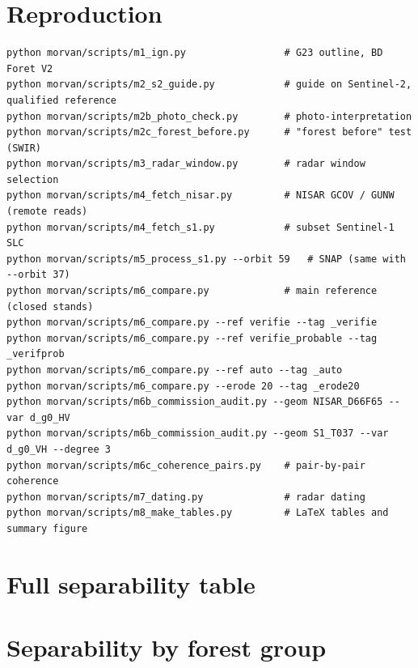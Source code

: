 \documentclass[11pt,a4paper]{article}
\begin{document}
\appendix
\section{Reproduction}
\begin{verbatim}
python morvan/scripts/m1_ign.py                 # G23 outline, BD Foret V2
python morvan/scripts/m2_s2_guide.py            # guide on Sentinel-2, qualified reference
python morvan/scripts/m2b_photo_check.py        # photo-interpretation
python morvan/scripts/m2c_forest_before.py      # "forest before" test (SWIR)
python morvan/scripts/m3_radar_window.py        # radar window selection
python morvan/scripts/m4_fetch_nisar.py         # NISAR GCOV / GUNW (remote reads)
python morvan/scripts/m4_fetch_s1.py            # subset Sentinel-1 SLC
python morvan/scripts/m5_process_s1.py --orbit 59   # SNAP (same with --orbit 37)
python morvan/scripts/m6_compare.py             # main reference (closed stands)
python morvan/scripts/m6_compare.py --ref verifie --tag _verifie
python morvan/scripts/m6_compare.py --ref verifie_probable --tag _verifprob
python morvan/scripts/m6_compare.py --ref auto --tag _auto
python morvan/scripts/m6_compare.py --erode 20 --tag _erode20
python morvan/scripts/m6b_commission_audit.py --geom NISAR_D66F65 --var d_g0_HV
python morvan/scripts/m6b_commission_audit.py --geom S1_T037 --var d_g0_VH --degree 3
python morvan/scripts/m6c_coherence_pairs.py    # pair-by-pair coherence
python morvan/scripts/m7_dating.py              # radar dating
python morvan/scripts/m8_make_tables.py         # LaTeX tables and summary figure
\end{verbatim}

\section{Full separability table}
\begin{table}[H]
\centering\scriptsize
\caption{All variables, main reference (cut / forest means, Cohen's d, AUC and 95~\% CI, Jeffries-Matusita distance).}

\end{table}

\section{Separability by forest group}
\begin{table}[H]
\centering\small
\caption{Cross-pol $\Delta\gamma^0$ AUC by forest group, automatic reference (60 objects). Values close to 0.5 in
broadleaves mostly reflect reference errors (senescence).}

\end{table}
\end{document}
